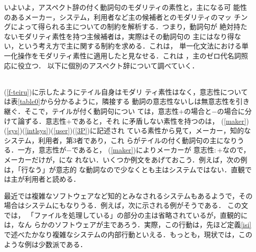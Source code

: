 {いよいよ，アスペクト辞の付く動詞句のモダリティの素性と，{\dg 主}になる可
能性のあるメーカー，システム，利用者など{\dg 主}の候補者とのモダリティのマッ
チングによって得られる{\dg 主}についての制約を解析する．つまり，動詞句が
絶対持たないモダリティ素性を持つ{\dg 主}候補者は，実際はその動詞句の{\dg 
主}にはなり得ない，という考え方で{\dg 主}に関する制約を求める．これは，
単一化文法における単一化操作をモダリティ素性に適用したと見なせる．これは
，{\dg 主}のゼロ代名詞照応に役立つ．
以下に個別のアスペクト辞について調べていく．

\\ (\ref{f-teiru})に示したようにテイル自身はモダリ
ティ素性はなく，意志性については表\ref{table0}から分かるように，隣接する
動詞の意志性ないしは無意志性を引き継ぐ．そこで，テイルが付く動詞句につい
ては，\hspace*{-0.3mm}意志性\hspace*{-0.2mm}$+$\hspace*{-0.2mm}の場合と\hspace*{-0.2mm}$-$\hspace*{-0.2mm}の場合に分けて論ずる．\hspace*{-0.3mm}意志性\hspace*{-0.2mm}$+$\hspace*{-0.2mm}であると，\hspace*{-0.3mm}それ
に矛盾しない素性を持つのは，
(\ref{maker})(\ref{sys})(\ref{intlsys})(\ref{user})(\ref{3P})に記述され
ている素性から見て，メーカー，知的なシステム，利用者，第3者であり，これ
らがテイルの付く動詞句の{\dg 主}になりうる．一方，意志性が$-$であると，
(\ref{maker})によりメーカーが \hspace*{-0.2mm}意志性$:+$なので，\hspace*{-0.2mm}メーカーだけが，\hspace*{-0.2mm}{\dg 主}にな
れない．\hspace*{-0.2mm}いくつか例文をあげておこう．例えば，次の例は，「行なう」が意志的
な動詞なので少なくとも{\dg 主}はシステムではない．直観では{\dg 主}が利用者と読める．

最近では複雑なソフトウェアなど知的とみなされるシステムもあるようで，その
場合はシステムにもなりうる．例えば，次に示される例がそうである．
この文では，
「ファイルを処理している」の部分の{\dg 主}は省略されているが，直観的には，なん
らかのソフトウェアが{\dg 主}であろう．実際，この行動は，先ほど定義\ref{isi}
で述べたかなり複雑なシステムの内部行動といえる．もっとも，現状では，この
ような例は少数派である．

}
